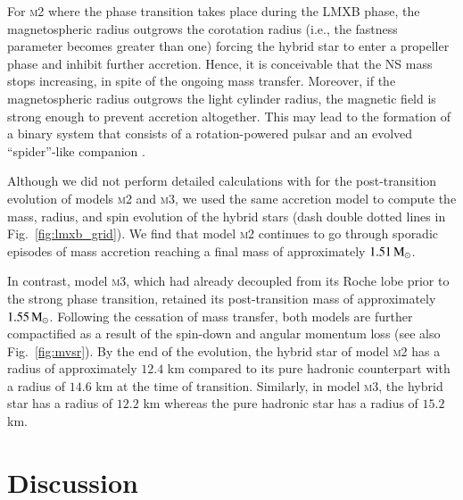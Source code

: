\documentclass[main.tex]{subfiles}
\begin{document}
    For \textsc{m2} where the phase transition takes place during the LMXB phase, the magnetospheric radius outgrows the corotation radius (i.e., the fastness parameter becomes greater than one) forcing the hybrid star to enter a propeller phase and inhibit further accretion. Hence, it is conceivable that the NS mass stops increasing, in spite of the ongoing mass transfer. Moreover, if the magnetospheric radius outgrows the light cylinder radius, the magnetic field is strong enough to prevent accretion altogether. This may lead to the formation of a binary system that consists of a rotation-powered pulsar and an evolved ``spider''-like companion \cite[see][and references therein]{Strader:2019,Papitto:2022}.  
    
    Although we did not perform detailed calculations with \mesa for the post-transition evolution of models \textsc{m2} and \textsc{m3}, we used the same accretion model to compute the mass, radius, and spin evolution of the hybrid stars (dash double dotted lines in Fig.~\ref{fig:lmxb_grid}). We find that model \textsc{m2} continues to go through sporadic episodes of mass accretion reaching a final mass of approximately $1.51\mathrm{\,M_\odot}$. 
    
    In contrast, model \textsc{m3}, which had already decoupled from its Roche lobe prior to the strong phase transition, retained its post-transition mass of approximately $1.55\mathrm{\,M_\odot}$. Following the cessation of  mass transfer, both models are further compactified as a result of the spin-down and angular momentum loss (see also Fig.~\ref{fig:mvsr}). By the end of the evolution, the hybrid star of model \textsc{m2} has a radius of approximately $12.4$ km compared to its pure hadronic counterpart with a radius of $14.6$ km at the time of transition. Similarly, in model \textsc{m3}, the hybrid star has a radius of $12.2$ km whereas the pure hadronic star has a radius of $15.2$ km.
    
    
    \section{Discussion} \label{sec:ch4:summary}
    
\end{document}
